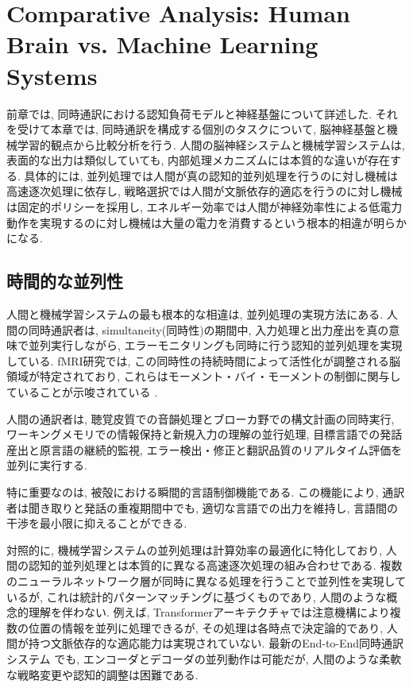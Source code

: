 \section{Comparative Analysis: Human Brain vs. Machine Learning Systems}

前章では, 同時通訳における認知負荷モデルと神経基盤について詳述した.
それを受けて本章では, 同時通訳を構成する個別のタスクについて, 脳神経基盤と機械学習的観点から比較分析を行う.
人間の脳神経システムと機械学習システムは, 表面的な出力は類似していても, 内部処理メカニズムには本質的な違いが存在する.
具体的には, 並列処理では人間が真の認知的並列処理を行うのに対し機械は高速逐次処理に依存し, 戦略選択では人間が文脈依存的適応を行うのに対し機械は固定的ポリシーを採用し, エネルギー効率では人間が神経効率性による低電力動作を実現するのに対し機械は大量の電力を消費するという根本的相違が明らかになる.

\subsection{時間的な並列性}

人間と機械学習システムの最も根本的な相違は, 並列処理の実現方法にある.
人間の同時通訳者は, simultaneity(同時性)の期間中, 入力処理と出力産出を真の意味で並列実行しながら, エラーモニタリングも同時に行う認知的並列処理を実現している.
fMRI研究では, この同時性の持続時間によって活性化が調整される脳領域が特定されており, これらはモーメント・バイ・モーメントの制御に関与していることが示唆されている \cite{hervais2015fmri}.

人間の通訳者は, 聴覚皮質での音韻処理とブローカ野での構文計画の同時実行, ワーキングメモリでの情報保持と新規入力の理解の並行処理, 目標言語での発話産出と原言語の継続的監視, エラー検出・修正と翻訳品質のリアルタイム評価を並列に実行する.

特に重要なのは, 被殻における瞬間的言語制御機能である.
この機能により, 通訳者は聞き取りと発話の重複期間中でも, 適切な言語での出力を維持し, 言語間の干渉を最小限に抑えることができる.

対照的に, 機械学習システムの並列処理は計算効率の最適化に特化しており, 人間の認知的並列処理とは本質的に異なる高速逐次処理の組み合わせである.
複数のニューラルネットワーク層が同時に異なる処理を行うことで並列性を実現しているが, これは統計的パターンマッチングに基づくものであり, 人間のような概念的理解を伴わない.
例えば, Transformerアーキテクチャでは注意機構により複数の位置の情報を並列に処理できるが, その処理は各時点で決定論的であり, 人間が持つ文脈依存的な適応能力は実現されていない.
最新のEnd-to-End同時通訳システム \cite{ma2024nast, zhang2024streamspeech} でも, エンコーダとデコーダの並列動作は可能だが, 人間のような柔軟な戦略変更や認知的調整は困難である.

